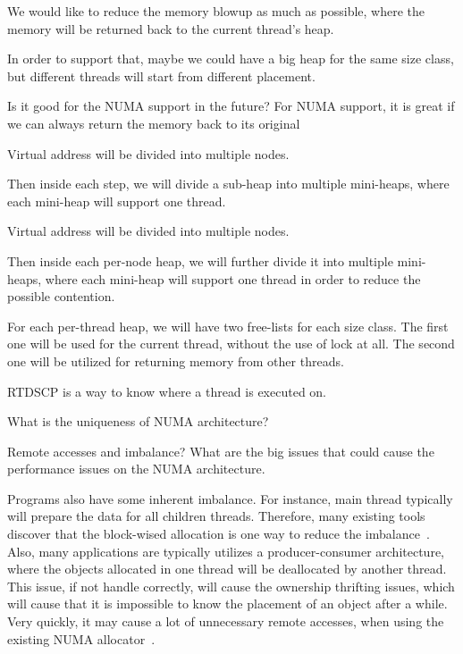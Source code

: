We would like to reduce the memory blowup as much as possible, where the memory will be returned back to the current thread's heap. 

In order to support that, maybe we could have a big heap for the same size class, but different threads will start from different placement. 

Is it good for the NUMA support in the future? For NUMA support, it is great if we can always return the memory back to its original 


Virtual address will be divided into multiple nodes. 

Then inside each step, we will divide a sub-heap into multiple mini-heaps, where each mini-heap will support one thread. 


Virtual address will be divided into multiple nodes. 

Then inside each per-node heap, we will further divide it into multiple mini-heaps, where each mini-heap will support one thread in order to reduce the possible contention. 

For each per-thread heap, we will have two free-lists for each size class. The first one will be used for the current thread, without the use of lock at all. The second one will be utilized for returning memory from other threads.  

RTDSCP is a way to know where a thread is executed on. 





What is the uniqueness of NUMA architecture? 

Remote accesses and imbalance? 
What are the big issues that could cause the performance issues on the NUMA architecture. 

Programs also have some inherent imbalance. For instance, main thread typically will prepare the data for all children threads. Therefore, many existing tools discover that the block-wised allocation is one way to reduce the imbalance~\cite{XuNuma, XXX}. 
Also, many applications are typically utilizes a producer-consumer architecture, where the objects allocated in one thread will be deallocated by another thread. This issue, if not handle correctly, will cause the ownership thrifting issues, which will cause that it is impossible to know the placement of an object after a while. Very quickly, it may cause a lot of unnecessary remote accesses, when using the existing NUMA allocator~\cite{}.  

